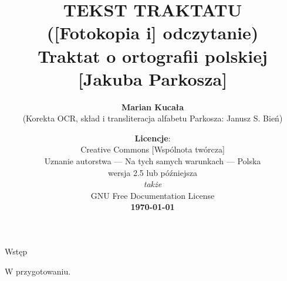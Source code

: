\documentclass[dvipsnames,12pt]{article}
\author{\textbf{Marian Kucała}\\(Korekta OCR, skład i transliteracja alfabetu Parkosza: Janusz S. Bień)}
\title{TEKST TRAKTATU\\[-.5ex]([Fotokopia i] odczytanie)\\[-.5ex]Traktat o ortografii polskiej [Jakuba Parkosza]}
\date{\textbf{Licencje}:\\ \relsize{-1}Creative Commons [Wspólnota twórcza]\\[-.4ex]
Uznanie autorstwa --- Na tych samych warunkach --- Polska\\
wersja 2.5 lub późniejsza\\\textit{także}\\
GNU Free Documentation License\\
\textbf{\today}}
\begin{document}
\maketitle
\thispagestyle{empty}
\newpage

\begin{center}
  Wstęp 
\end{center}

W przygotowaniu.



\raggedright

\newpage
{}
 
 \newpage
 
 \newpage
 
 
\newpage

\newpage

\newpage
 
\newpage
 
\newpage
 
\newpage
 
\newpage
 
\newpage
 
\newpage
 
\newpage
 

 \everypar{}
\newpage
\printbibliography
\end{document}
